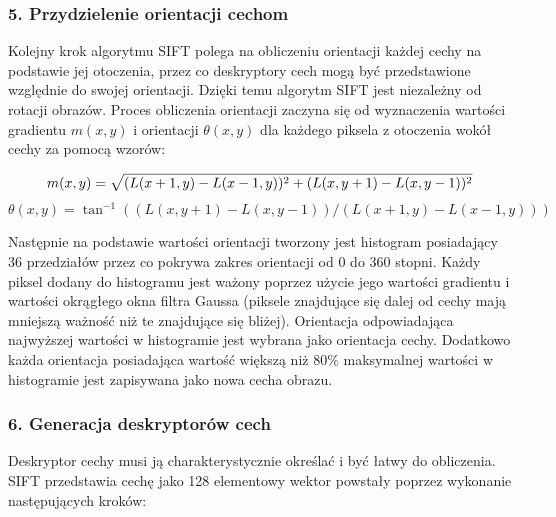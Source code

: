 \subsubsection{5. Przydzielenie orientacji cechom}
\label{sec:proponowane_algorytmy:orientacja}

Kolejny krok algorytmu SIFT polega na obliczeniu orientacji każdej cechy na podstawie jej otoczenia, przez co deskryptory cech mogą być przedstawione względnie do swojej orientacji. Dzięki temu algorytm SIFT jest niezależny od rotacji obrazów. Proces obliczenia orientacji zaczyna się od wyznaczenia wartości gradientu $m(x, y)$ i orientacji $\theta(x, y)$ dla każdego piksela z otoczenia wokół cechy za pomocą wzorów:

\begin{equation}
m(x, y) = \sqrt{(L(x + 1, y) - L(x - 1, y))^2 + (L(x, y + 1) - L(x, y - 1))^2} \\
\label{eq:magnitude}
\end{equation}
\begin{equation}
\theta(x, y) = \tan^{-1}((L(x, y + 1) - L(x, y - 1))/(L(x + 1, y) - L(x - 1, y)))
\label{eq:orientation}
\end{equation}

Następnie na podstawie wartości orientacji tworzony jest histogram posiadający 36 przedziałów przez co pokrywa zakres orientacji od 0 do 360 stopni. Każdy piksel dodany do histogramu jest ważony poprzez użycie jego wartości gradientu i wartości okrągłego okna filtra Gaussa (piksele znajdujące się dalej od cechy mają mniejszą ważność niż te znajdujące się bliżej). Orientacja odpowiadająca najwyższej wartości w histogramie jest wybrana jako orientacja cechy. Dodatkowo każda orientacja posiadająca wartość większą niż 80\% maksymalnej wartości w histogramie jest zapisywana jako nowa cecha obrazu.

\subsubsection{6. Generacja deskryptorów cech}
\label{sec:proponowane_algorytmy:deskryptor}

Deskryptor cechy musi ją charakterystycznie określać i być łatwy do obliczenia. SIFT przedstawia cechę jako 128 elementowy wektor powstały poprzez wykonanie następujących kroków:


